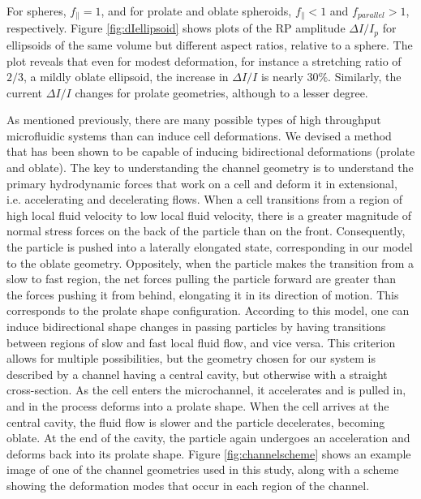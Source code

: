 		
		For spheres, $f_{\parallel}=1$, and for prolate and oblate spheroids, $f_{\parallel}<1$ and $f_{parallel}>1$, respectively. Figure \ref{fig:dIellipsoid} shows plots of the RP amplitude $\Delta I/I_{p}$ for ellipsoids of the same volume but different aspect ratios, relative to a sphere. The plot reveals that even for modest deformation, for instance a stretching ratio of $2/3$, a mildly oblate ellipsoid, the increase in $\Delta I/I$ is nearly $30\%$. Similarly, the current $\Delta I/I$ changes for prolate geometries, although to a lesser degree.
		
		As mentioned previously, there are many possible types of high throughput microfluidic systems than can induce cell deformations. We devised a method that has been shown to be capable of inducing bidirectional deformations (prolate and oblate). The key to understanding the channel geometry is to understand the primary hydrodynamic forces that work on a cell and deform it in extensional, i.e. accelerating and decelerating flows. When a cell transitions from a region of high local fluid velocity to low local fluid velocity, there is a greater magnitude of normal stress forces on the back of the particle than on the front. Consequently, the particle is pushed into a laterally elongated state, corresponding in our model to the oblate geometry. Oppositely, when the particle makes the transition from a slow to fast region, the net forces pulling the particle forward are greater than the forces pushing it from behind, elongating it in its direction of motion. This corresponds to the prolate shape configuration. According to this model, one can induce bidirectional shape changes in passing particles by having transitions between regions of slow and fast local fluid flow, and vice versa. This criterion allows for multiple possibilities, but the geometry chosen for our system is described by a channel having a central cavity, but otherwise with a straight cross-section. As the cell enters the microchannel, it accelerates and is pulled in, and in the process deforms into a prolate shape. When the cell arrives at the central cavity, the fluid flow is slower and the particle decelerates, becoming oblate. At the end of the cavity, the particle again undergoes an acceleration and deforms back into its prolate shape. Figure \ref{fig:channelscheme} shows an example image of one of the channel geometries used in this study, along with a scheme showing the deformation modes that occur in each region of the channel.
		
